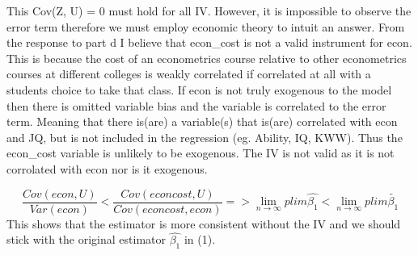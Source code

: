 \documentclass[
  12pt,
  landscape]{article}
\begin{document}
This Cov(Z, U) = 0 must hold for all IV. However, it is impossible to
observe the error term therefore we must employ economic theory to
intuit an answer. From the response to part d I believe that econ\_cost
is not a valid instrument for econ. This is because the cost of an
econometrics course relative to other econometrics courses at different
colleges is weakly correlated if correlated at all with a students
choice to take that class. If econ is not truly exogenous to the model
then there is omitted variable bias and the variable is correlated to
the error term. Meaning that there is(are) a variable(s) that is(are)
correlated with econ and JQ, but is not included in the regression (eg.
Ability, IQ, KWW). Thus the econ\_cost variable is unlikely to be
exogenous. The IV is not valid as it is not corrolated with econ nor is
it exogenous.

\[
\frac{Cov(econ, U)}{Var(econ)}< \frac{Cov(econcost, U)}{Cov(econcost,econ)} => \lim_{n\to\infty}{plim\hat{\beta_1}} < \lim_{n\to\infty}{plim\tilde{\beta_1}}
\] This shows that the estimator is more consistent without the IV and
we should stick with the original estimator \(\hat{\beta_1}\) in (1).
\end{document}
